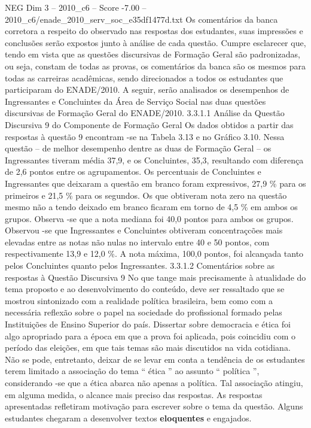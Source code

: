 \begin{textsample}{NEG Dim 3 – 2010\_c6 – Score -7.00 – 2010\_c6/enade\_2010\_serv\_soc\_e35df1477d.txt}
Os comentários da banca corretora a respeito do observado nas respostas dos estudantes, suas impressões e conclusões serão expostos junto à análise de cada questão.
Cumpre esclarecer que, tendo em vista que as questões discursivas de Formação Geral são padronizadas, ou seja, constam de todas as provas, os comentários da banca são os mesmos para todas as carreiras acadêmicas, sendo direcionados a todos os estudantes que participaram do ENADE/2010.
A seguir, serão analisados os desempenhos de Ingressantes e Concluintes da Área de Serviço Social nas duas questões discursivas de Formação Geral do ENADE/2010. 3.3.1.1 Análise da Questão Discursiva 9 do Componente de Formação Geral Os dados obtidos a partir das respostas à questão 9 encontram -se na Tabela 3.13 e no Gráfico 3.10.
Nessa questão – de melhor desempenho dentre as duas de Formação Geral – os Ingressantes tiveram média 37,9, e os Concluintes, 35,3, resultando com diferença de 2,6 pontos entre os agrupamentos.
Os percentuais de Concluintes e Ingressantes que deixaram a questão em branco foram expressivos, 27,9 \% para os primeiros e 21,5 \% para os segundos.
Os que obtiveram nota zero na questão mesmo não a tendo deixado em branco ficaram em torno de 4,5 \% em ambos os grupos.
Observa -se que a nota mediana foi 40,0 pontos para ambos os grupos.
Observou -se que Ingressantes e Concluintes obtiveram concentraçcões mais elevadas entre as notas não nulas no intervalo entre 40 e 50 pontos, com respectivamente 13,9 e 12,0 \%.
A nota máxima, 100,0 pontos, foi alcançada tanto pelos Concluintes quanto pelos Ingressantes. 3.3.1.2 Comentários sobre as respostas à Questão Discursiva 9 No que tange mais precisamente à atualidade do tema proposto e ao desenvolvimento do conteúdo, deve ser ressaltado que se mostrou sintonizado com a realidade política brasileira, bem como com a necessária reflexão sobre o papel na sociedade do profissional formado pelas Instituições de Ensino Superior do país.
Dissertar sobre democracia e ética foi algo apropriado para a época em que a prova foi aplicada, pois coincidiu com o período das eleições, em que tais temas são mais discutidos na vida cotidiana.
Não se pode, entretanto, deixar de se levar em conta a tendência de os estudantes terem limitado a associação do tema “ ética ” ao assunto “ política ”, considerando -se que a ética abarca não apenas a política.
Tal associação atingiu, em alguma medida, o alcance mais preciso das respostas.
As respostas apresentadas refletiram motivação para escrever sobre o tema da questão.
Alguns estudantes chegaram a desenvolver textos \textbf{eloquentes} e engajados.

\end{textsample}
